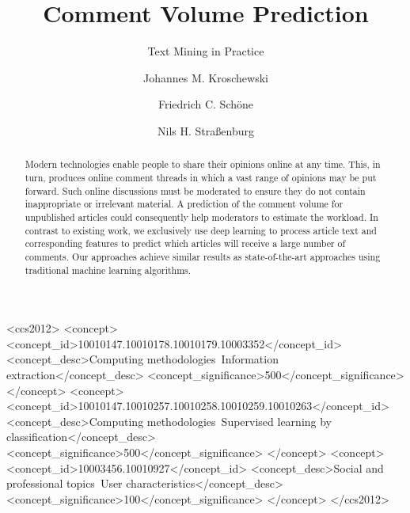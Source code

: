 \documentclass[sigconf]{acmart}
\begin{document}
\title{Comment Volume Prediction}
\subtitle{Text Mining in Practice} 

\author{Johannes M. Kroschewski}

\author{Friedrich C. Schöne}

\author{Nils H. Straßenburg}

\begin{abstract}
Modern technologies enable people to share their opinions online at any time.
This, in turn, produces online comment threads in which a vast range of opinions may be put forward. 
Such online discussions must be moderated to ensure they do not contain inappropriate or irrelevant material. 
A prediction of the comment volume for unpublished articles could consequently help moderators to estimate the workload. 
In contrast to existing work, we exclusively use deep learning to process article text and corresponding features to predict which articles will receive a large number of comments.
Our approaches achieve similar results as state-of-the-art approaches using traditional machine learning algorithms.
\end{abstract}

\begin{CCSXML}
	<ccs2012>
	<concept>
	<concept_id>10010147.10010178.10010179.10003352</concept_id>
	<concept_desc>Computing methodologies~Information extraction</concept_desc>
	<concept_significance>500</concept_significance>
	</concept>
	<concept>
	<concept_id>10010147.10010257.10010258.10010259.10010263</concept_id>
	<concept_desc>Computing methodologies~Supervised learning by classification</concept_desc>
	<concept_significance>500</concept_significance>
	</concept>
	<concept>
	<concept_id>10003456.10010927</concept_id>
	<concept_desc>Social and professional topics~User characteristics</concept_desc>
	<concept_significance>100</concept_significance>
	</concept>
	</ccs2012>
\end{CCSXML}
\end{document}
